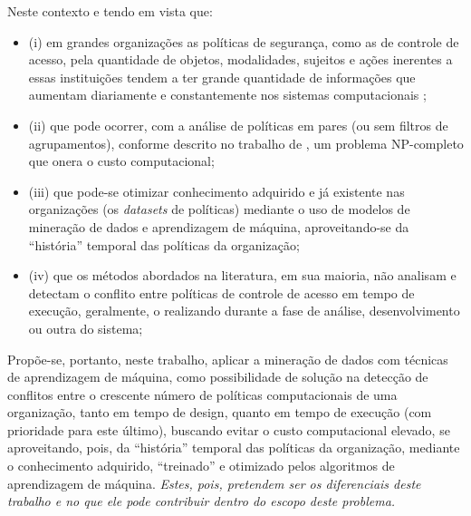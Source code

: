 \documentclass[
	12pt,				%
	openright,			%
	oneside,			%
	a4paper,			%
	english,			%
	french,				%
	spanish,			%
	brazil				%
	]{abntex2}
\begin{document}
Neste contexto e tendo em vista que: 
\begin{itemize}
	\item (i) em grandes organizações as políticas de segurança, como as de controle de acesso, pela quantidade de objetos, modalidades, sujeitos e ações inerentes a essas instituições tendem a ter grande quantidade de informações que aumentam diariamente e constantemente nos sistemas computacionais \cite{fugini_information_2004} \cite{bellettini_role_2001} \cite{ueda_tese_2012};
	\item (ii) que pode ocorrer, com a análise de políticas em pares (ou sem filtros de agrupamentos), conforme descrito no trabalho de , um problema NP-completo que onera o custo computacional;
	\item (iii) que pode-se otimizar conhecimento adquirido e já existente nas organizações (os \textit{datasets} de políticas) mediante o uso de modelos de mineração de dados e aprendizagem de máquina, aproveitando-se da ``história'' temporal das políticas da organização;
	\item (iv) que os métodos abordados na literatura, em sua maioria, não analisam e detectam o conflito entre políticas de controle de acesso em tempo de execução, geralmente, o realizando durante a fase de análise, desenvolvimento ou outra do sistema;
\end{itemize}  

Propõe-se, portanto, neste trabalho, aplicar a mineração de dados com técnicas de aprendizagem de máquina, como possibilidade de solução na detecção de conflitos entre o crescente número de políticas computacionais de uma organização, tanto em tempo de design, quanto em tempo de execução (com prioridade para este último), buscando evitar o custo computacional elevado, se aproveitando, pois, da ``história'' temporal das políticas da organização, mediante o conhecimento adquirido, ``treinado'' e otimizado pelos algoritmos de aprendizagem de máquina. \textit{Estes, pois, pretendem ser os diferenciais deste trabalho e no que ele pode contribuir dentro do escopo deste problema.}
\end{document}
